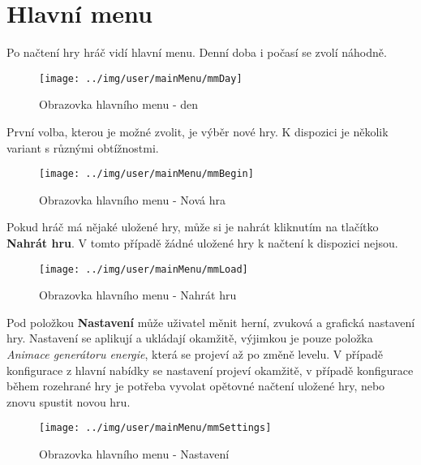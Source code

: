 
\section{Hlavní menu}

Po načtení hry hráč vidí hlavní menu. Denní doba i počasí se zvolí náhodně.

\begin{figure}[!ht]\centering
\texttt{[image: ../img/user/mainMenu/mmDay]}

\caption{Obrazovka hlavního menu - den}
\label{fig:user_mainMenu_mmDay}

\end{figure}


\FloatBarrier

První volba, kterou je možné zvolit, je výběr nové hry. K dispozici je několik variant s různými obtížnostmi.

\begin{figure}[!ht]\centering
\texttt{[image: ../img/user/mainMenu/mmBegin]}

\caption{Obrazovka hlavního menu - Nová hra}
\label{fig:user_mainMenu_mmBegin}

\end{figure}
\FloatBarrier

Pokud hráč má nějaké uložené hry, může si je nahrát kliknutím na tlačítko \textbf{Nahrát hru}. V tomto případě žádné uložené hry k načtení k dispozici nejsou.

\begin{figure}[!ht]\centering
\texttt{[image: ../img/user/mainMenu/mmLoad]}

\caption{Obrazovka hlavního menu - Nahrát hru}
\label{fig:user_mainMenu_mmLoad}

\end{figure}
\FloatBarrier

Pod položkou \textbf{Nastavení} může uživatel měnit herní, zvuková a grafická nastavení hry. Nastavení se aplikují a ukládají okamžitě, výjimkou je pouze položka \textit{Animace generátoru energie}, která se projeví až po změně levelu. V případě konfigurace z hlavní nabídky se nastavení projeví okamžitě, v případě konfigurace během rozehrané hry je potřeba vyvolat opětovné načtení uložené hry, nebo znovu spustit novou hru.

\begin{figure}[!ht]\centering
\texttt{[image: ../img/user/mainMenu/mmSettings]}

\caption{Obrazovka hlavního menu - Nastavení}
\label{fig:user_mainMenu_mmSettings}

\end{figure}

\FloatBarrier